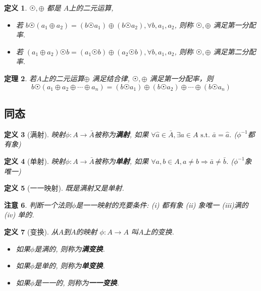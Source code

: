 \documentclass[UTF8]{ctexart}
\newtheorem{Definition}{\hspace{2em}定义}%
\newtheorem{Theorem}[Definition]{\hspace{2em}定理}
\newtheorem{Remark}[Definition]{\hspace{2em}注意}
\begin{document}
\begin{Definition}
$ \astrosun, \oplus $ 都是 $A$上的二元运算, 
\begin{itemize}
\item 若
$ b \astrosun (a_1 \oplus a_2) = (b \astrosun a_1) \oplus (b \astrosun a_2), \forall b, a_1, a_2 $, 则称 $ \astrosun, \oplus $  满足第一分配率.
\item 若
$ (a_1 \oplus a_2) \astrosun b = (a_1 \astrosun b) \oplus ( a_2 \astrosun b), \forall b, a_1, a_2 $, 则称 $ \astrosun, \oplus $  满足第二分配率.
\end{itemize}
\end{Definition}


\begin{Theorem}
若$A$上的二元运算$\oplus$ 满足结合律, $ \astrosun, \oplus $ 满足第一分配率，则
$$
b \astrosun ( a_1 \oplus a_2 \oplus \cdots \oplus a_n ) =  ( b \astrosun a_1) \oplus (b \astrosun a_2) \oplus \cdots \oplus (b \astrosun a_n)
$$
\end{Theorem}

\subsection{同态}

\begin{Definition}[满射]
映射$\phi: A \rightarrow \bar{A}$被称为\textbf{满射}, 如果
$\forall \hat{a} \in \bar{A}, \exists a \in A \text{ s.t. } \bar{a} = \hat{a}$. 
($\phi^{-1}$都有象)
\end{Definition}

\begin{Definition}[单射]
映射$\phi: A \rightarrow \bar{A}$被称为\textbf{单射}, 如果
$\forall a, b \in A, a \neq b \Rightarrow \bar{a} \neq \bar{b}$.
 ($\phi^{-1}$象唯一)
\end{Definition}

\begin{Definition}[一一映射]
既是满射又是单射.
\end{Definition}

\begin{Remark}
 		判断一个法则$\phi$是一一映射的充要条件: (i) 都有象 (ii) 象唯一 (iii)满的 (iv) 单的.
\end{Remark}

\begin{Definition}[变换]
从$A$到$A$的映射 $\phi: A \rightarrow A$ 叫$A$上的变换.
\begin{itemize}
	\item 如果$\phi$是满的, 则称为\textbf{满变换}.
	\item 如果$\phi$是单的, 则称为\textbf{单变换}.
	\item 如果$\phi$是一一的, 则称为\textbf{一一变换}.
\end{itemize}
\end{Definition}
\end{document}
